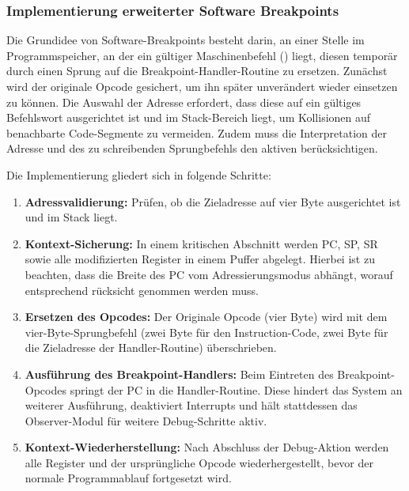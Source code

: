
\subsubsection{Implementierung erweiterter Software Breakpoints}
\label{sec:ImplementierungSoftwareBreakpoints}

Die Grundidee von Software-Breakpoints besteht darin, an einer Stelle im Programmspeicher, an der ein g\"ultiger Maschinenbefehl () liegt, diesen tempor\"ar durch einen Sprung auf die Breakpoint-Handler-Routine zu ersetzen. Zun\"achst wird der originale Opcode gesichert, um ihn sp\"ater unver\"andert wieder einsetzen zu k\"onnen. Die Auswahl der Adresse erfordert, dass diese auf ein g\"ultiges Befehlswort ausgerichtet ist und im Stack-Bereich liegt, um Kollisionen auf benachbarte Code-Segmente zu vermeiden. Zudem muss die Interpretation der Adresse und des zu schreibenden Sprungbefehls den aktiven  ber\"ucksichtigen.

\newpage
Die Implementierung gliedert sich in folgende Schritte:
\begin{enumerate}
	\item \textbf{Adressvalidierung:} Pr\"ufen, ob die Zieladresse auf vier Byte ausgerichtet ist und im Stack liegt.
	  
	\item \textbf{Kontext-Sicherung:} In einem kritischen Abschnitt werden PC, SP, SR sowie alle modifizierten Register in einem Puffer abgelegt. Hierbei ist zu beachten, dass die Breite des PC vom Adressierungsmodus abh\"angt, worauf entsprechend r\"ucksicht genommen werden muss. 
	
	\item \textbf{Ersetzen des Opcodes:} Der Originale Opcode (vier Byte) wird mit dem vier-Byte-Sprungbefehl (zwei Byte f\"ur den Instruction-Code, zwei Byte f\"ur die Zieladresse der Handler-Routine) \"uberschrieben. 
	
	\item \textbf{Ausf\"uhrung des Breakpoint-Handlers:} Beim Eintreten des Breakpoint-Opcodes springt der PC in die Handler-Routine. Diese hindert das System an weiterer Ausf\"uhrung, deaktiviert Interrupts und h\"alt stattdessen das Observer-Modul f\"ur weitere Debug-Schritte aktiv.
	
	\item \textbf{Kontext-Wiederherstellung:} Nach Abschluss der Debug-Aktion werden alle Register und der urspr\"ungliche Opcode wiederhergestellt, bevor der normale Programmablauf fortgesetzt wird.
\end{enumerate}

